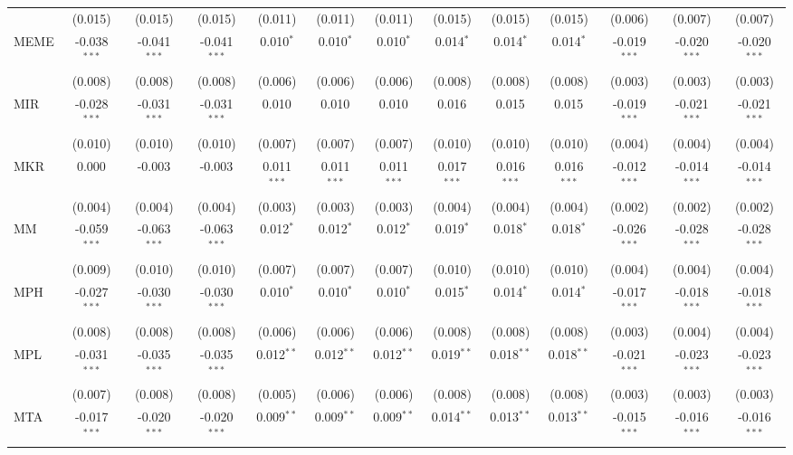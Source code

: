 \begin{table}[!htbp]
\begin{tabular}{@{\extracolsep{5pt}}lcccccccccccc}
  & (0.015) & (0.015) & (0.015) & (0.011) & (0.011) & (0.011) & (0.015) & (0.015) & (0.015) & (0.006) & (0.007) & (0.007) \\
 MEME & -0.038$^{***}$ & -0.041$^{***}$ & -0.041$^{***}$ & 0.010$^{*}$ & 0.010$^{*}$ & 0.010$^{*}$ & 0.014$^{*}$ & 0.014$^{*}$ & 0.014$^{*}$ & -0.019$^{***}$ & -0.020$^{***}$ & -0.020$^{***}$ \\
  & (0.008) & (0.008) & (0.008) & (0.006) & (0.006) & (0.006) & (0.008) & (0.008) & (0.008) & (0.003) & (0.003) & (0.003) \\
 MIR & -0.028$^{***}$ & -0.031$^{***}$ & -0.031$^{***}$ & 0.010$^{}$ & 0.010$^{}$ & 0.010$^{}$ & 0.016$^{}$ & 0.015$^{}$ & 0.015$^{}$ & -0.019$^{***}$ & -0.021$^{***}$ & -0.021$^{***}$ \\
  & (0.010) & (0.010) & (0.010) & (0.007) & (0.007) & (0.007) & (0.010) & (0.010) & (0.010) & (0.004) & (0.004) & (0.004) \\
 MKR & 0.000$^{}$ & -0.003$^{}$ & -0.003$^{}$ & 0.011$^{***}$ & 0.011$^{***}$ & 0.011$^{***}$ & 0.017$^{***}$ & 0.016$^{***}$ & 0.016$^{***}$ & -0.012$^{***}$ & -0.014$^{***}$ & -0.014$^{***}$ \\
  & (0.004) & (0.004) & (0.004) & (0.003) & (0.003) & (0.003) & (0.004) & (0.004) & (0.004) & (0.002) & (0.002) & (0.002) \\
 MM & -0.059$^{***}$ & -0.063$^{***}$ & -0.063$^{***}$ & 0.012$^{*}$ & 0.012$^{*}$ & 0.012$^{*}$ & 0.019$^{*}$ & 0.018$^{*}$ & 0.018$^{*}$ & -0.026$^{***}$ & -0.028$^{***}$ & -0.028$^{***}$ \\
  & (0.009) & (0.010) & (0.010) & (0.007) & (0.007) & (0.007) & (0.010) & (0.010) & (0.010) & (0.004) & (0.004) & (0.004) \\
 MPH & -0.027$^{***}$ & -0.030$^{***}$ & -0.030$^{***}$ & 0.010$^{*}$ & 0.010$^{*}$ & 0.010$^{*}$ & 0.015$^{*}$ & 0.014$^{*}$ & 0.014$^{*}$ & -0.017$^{***}$ & -0.018$^{***}$ & -0.018$^{***}$ \\
  & (0.008) & (0.008) & (0.008) & (0.006) & (0.006) & (0.006) & (0.008) & (0.008) & (0.008) & (0.003) & (0.004) & (0.004) \\
 MPL & -0.031$^{***}$ & -0.035$^{***}$ & -0.035$^{***}$ & 0.012$^{**}$ & 0.012$^{**}$ & 0.012$^{**}$ & 0.019$^{**}$ & 0.018$^{**}$ & 0.018$^{**}$ & -0.021$^{***}$ & -0.023$^{***}$ & -0.023$^{***}$ \\
  & (0.007) & (0.008) & (0.008) & (0.005) & (0.006) & (0.006) & (0.008) & (0.008) & (0.008) & (0.003) & (0.003) & (0.003) \\
 MTA & -0.017$^{***}$ & -0.020$^{***}$ & -0.020$^{***}$ & 0.009$^{**}$ & 0.009$^{**}$ & 0.009$^{**}$ & 0.014$^{**}$ & 0.013$^{**}$ & 0.013$^{**}$ & -0.015$^{***}$ & -0.016$^{***}$ & -0.016$^{***}$ \\

\end{tabular}
\end{table}
